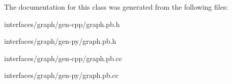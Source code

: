 The documentation for this class was generated from the following files:\begin{DoxyCompactItemize}
\item 
interfaces/graph/gen-\/cpp/graph.pb.h\item 
interfaces/graph/gen-\/py/graph.pb.h\item 
interfaces/graph/gen-\/cpp/graph.pb.cc\item 
interfaces/graph/gen-\/py/graph.pb.cc\end{DoxyCompactItemize}
